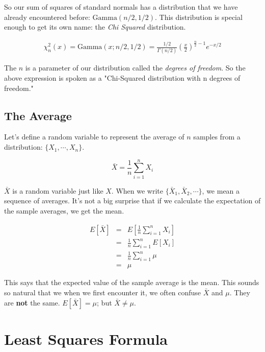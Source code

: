 \documentclass[]{article}
\begin{document}
So our sum of squares of standard normals has a distribution
that we have already encountered before: $\mbox{Gamma}(n/2, 1/2)$.
This distribution is special enough to get its own name:
the \emph{Chi Squared} distribution.

\begin{eqnarray} \label{chisq_density}
\chi_n^2(x) = \mbox{Gamma}(x; n/2, 1/2) = \frac{1/2}{\Gamma(n/2)} 
     \left( \frac{x}{2} \right)^{\frac{n}{2}-1} e^{- x/2}
\end{eqnarray}

The $n$ is a parameter of our distribution called the
\emph{degrees of freedom}.  So the above expression is
spoken as a 
"Chi-Squared distribution with n degrees of freedom."

\subsection{The Average}

Let's define a random variable to represent the average of
$n$ samples from a distribution: $\{X_1, \cdots , X_n\}$.

\begin{equation}
\bar{X} = \frac{1}{n} \sum_{i=1}^n X_i
\end{equation}

$\bar{X}$ is a random variable just like $X$.  When we
write $\{\bar{X}_1, \bar{X}_2, \cdots\}$, we mean a sequence
of averages.  It's not a big surprise that if we calculate the
expectation of the sample averages, we get the mean.

\begin{eqnarray*}
E[\bar{X}] &= & E \left[ \frac{1}{n} \sum_{i=1}^n X_i \right] \\
  &= & \frac{1}{n} \sum_{i=1}^n E \left[ X_i \right] \\
  &= & \frac{1}{n} \sum_{i=1}^n \mu \\
  &= & \mu 
\end{eqnarray*}

This says that the expected value of the sample average is
the mean.  This sounds so natural that we when we first
encounter it, we often confuse $\bar{X}$ and $\mu$.  They
are \textbf{not} the same.  $E[\bar{X}] = \mu$; but
$\bar{X} \ne \mu$.


\appendix

\section{Least Squares Formula}
\end{document}
